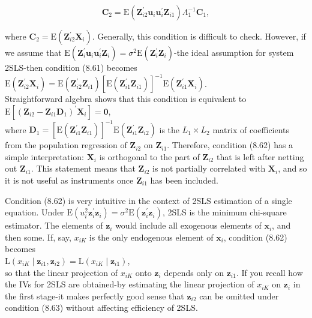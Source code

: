 \documentclass[10pt]{article}
\begin{document}
\begin{equation*}
\mathbf{C}_{2}=\mathrm{E}\left(\mathbf{Z}_{i 2}^{\prime} \mathbf{u}_{i} \mathbf{u}_{i}^{\prime} \mathbf{Z}_{i 1}\right) \Lambda_{1}^{-1} \mathbf{C}_{1}, \tag{8.61}
\end{equation*}


where $\mathbf{C}_{2}=\mathrm{E}\left(\mathbf{Z}_{i 2}^{\prime} \mathbf{X}_{i}\right)$. Generally, this condition is difficult to check. However, if we assume that $\mathrm{E}\left(\mathbf{Z}_{i}^{\prime} \mathbf{u}_{i} \mathbf{u}_{i}^{\prime} \mathbf{Z}_{i}\right)=\sigma^{2} \mathrm{E}\left(\mathbf{Z}_{i}^{\prime} \mathbf{Z}_{i}\right)$-the ideal assumption for system 2SLS-then condition (8.61) becomes\\
$\mathrm{E}\left(\mathbf{Z}_{i 2}^{\prime} \mathbf{X}_{i}\right)=\mathrm{E}\left(\mathbf{Z}_{i 2}^{\prime} \mathbf{Z}_{i 1}\right)\left[\mathrm{E}\left(\mathbf{Z}_{i 1}^{\prime} \mathbf{Z}_{i 1}\right)\right]^{-1} \mathrm{E}\left(\mathbf{Z}_{i 1}^{\prime} \mathbf{X}_{i}\right)$.\\
Straightforward algebra shows that this condition is equivalent to\\
$\mathrm{E}\left[\left(\mathbf{Z}_{i 2}-\mathbf{Z}_{i 1} \mathbf{D}_{1}\right)^{\prime} \mathbf{X}_{i}\right]=\mathbf{0}$,\\
where $\mathbf{D}_{1}=\left[\mathrm{E}\left(\mathbf{Z}_{i 1}^{\prime} \mathbf{Z}_{i 1}\right)\right]^{-1} \mathrm{E}\left(\mathbf{Z}_{i 1}^{\prime} \mathbf{Z}_{i 2}\right)$ is the $L_{1} \times L_{2}$ matrix of coefficients from the population regression of $\mathbf{Z}_{i 2}$ on $\mathbf{Z}_{i 1}$. Therefore, condition (8.62) has a simple interpretation: $\mathbf{X}_{i}$ is orthogonal to the part of $\mathbf{Z}_{i 2}$ that is left after netting out $\mathbf{Z}_{i 1}$. This statement means that $\mathbf{Z}_{i 2}$ is not partially correlated with $\mathbf{X}_{i}$, and so it is not useful as instruments once $\mathbf{Z}_{i 1}$ has been included.

Condition (8.62) is very intuitive in the context of 2SLS estimation of a single equation. Under $\mathrm{E}\left(u_{i}^{2} \mathbf{z}_{i}^{\prime} \mathbf{z}_{i}\right)=\sigma^{2} \mathrm{E}\left(\mathbf{z}_{i}^{\prime} \mathbf{z}_{i}\right)$, 2SLS is the minimum chi-square estimator. The elements of $\mathbf{z}_{i}$ would include all exogenous elements of $\mathbf{x}_{i}$, and then some. If, say, $x_{i K}$ is the only endogenous element of $\mathbf{x}_{i}$, condition (8.62) becomes\\
$\mathrm{L}\left(x_{i K} \mid \mathbf{z}_{i 1}, \mathbf{z}_{i 2}\right)=\mathrm{L}\left(x_{i K} \mid \mathbf{z}_{i 1}\right)$,\\
so that the linear projection of $x_{i K}$ onto $\mathbf{z}_{i}$ depends only on $\mathbf{z}_{i 1}$. If you recall how the IVs for 2SLS are obtained-by estimating the linear projection of $x_{i K}$ on $\mathbf{z}_{i}$ in the first stage-it makes perfectly good sense that $\mathbf{z}_{i 2}$ can be omitted under condition (8.63) without affecting efficiency of 2SLS.
\end{document}
